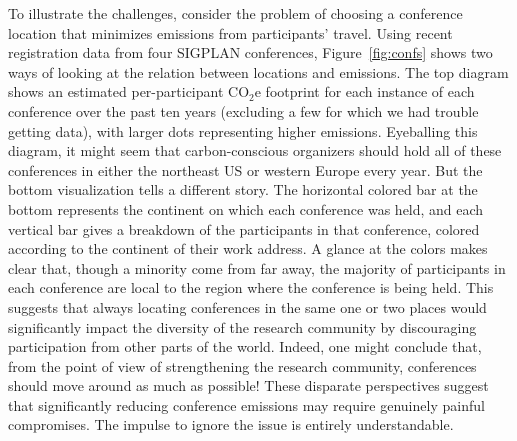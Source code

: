 \documentclass[12pt]{article}
\newcommand{\bcp}[1]{\ifdraft{\bf\textcolor{darkred}{[\bf bcp: #1]}}\fi}
\newcommand{\COtwoE}{CO$_2$e}
\begin{document}
To illustrate the challenges, consider the problem of choosing a conference
location that minimizes emissions from participants' travel.  Using recent
registration data from four \mbox{SIGPLAN} conferences, Figure~\ref{fig:confs}
shows two ways of looking at the relation between locations and emissions.
%
The top diagram shows an
estimated per-participant {\COtwoE} footprint for each instance of each
conference over the past ten years (excluding a few for which we
had trouble getting data), with larger dots representing higher emissions.
Eyeballing this diagram, it might seem that carbon-conscious
organizers should hold all of these conferences in either the northeast US or
western Europe every year.  But the bottom visualization tells a
different story.  The horizontal colored bar at the bottom represents
the continent on which each conference was held, and each vertical bar gives
a breakdown of the participants in that conference, colored according to the
continent of their work address.  A glance
at the colors makes clear that, though a minority come from far away, the
majority of participants in each conference are local to the region where the
conference is being held.
%
This suggests that always locating conferences in the
same one or two places would significantly impact the diversity of the
research community by discouraging participation from other parts of the
world.  Indeed, one might conclude that, from the point of view of
strengthening the research community, conferences should move around as
much as possible!
%
%
%
These disparate perspectives suggest that significantly reducing conference
emissions may
require genuinely painful compromises.  The impulse to ignore the issue is
entirely understandable.
\end{document}
